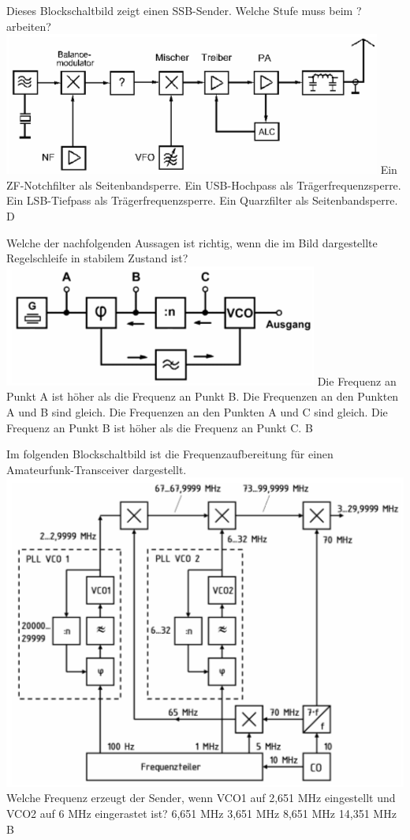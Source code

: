{Dieses Blockschaltbild zeigt einen SSB-Sender. Welche Stufe muss beim ? arbeiten?\\ \includegraphics[scale=0.4]{Frequenzaufbereitung/Bilder/TG101.png}}%
{Ein ZF-Notchfilter als Seitenbandsperre.}%
{Ein USB-Hochpass als Trägerfrequenzsperre.}%
{Ein LSB-Tiefpass als Trägerfrequenzsperre.}%
{Ein Quarzfilter als Seitenbandsperre.}%
{D}%

{Welche der nachfolgenden Aussagen ist richtig, wenn die im Bild dargestellte Regelschleife in stabilem Zustand ist?\\ \includegraphics[scale=0.4]{Frequenzaufbereitung/Bilder/TD701.png}}%
{Die Frequenz an Punkt A ist höher als die Frequenz an Punkt B.}%
{Die Frequenzen an den Punkten A und B sind gleich.}%
{Die Frequenzen an den Punkten A und C sind gleich.}%
{Die Frequenz an Punkt B ist höher als die Frequenz an Punkt C.}%
{B}%

{Im folgenden Blockschaltbild ist die Frequenzaufbereitung für einen Amateurfunk-Transceiver dargestellt.\\ \includegraphics[scale=0.4]{Frequenzaufbereitung/Bilder/TG110.png}\\
Welche Frequenz erzeugt der Sender, wenn VCO1 auf 2,651 MHz eingestellt und VCO2 auf 6 MHz eingerastet ist?}%
{6,651 MHz}%
{3,651 MHz}%
{8,651 MHz}%
{14,351 MHz}%
{B}%
